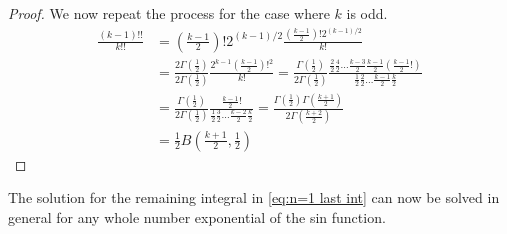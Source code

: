 \documentclass{article}
\begin{document}
\begin{proof}
	We now repeat the process for the case where $k$ is odd.
	\begin{align}
		\frac{(k-1)!!}{k!!} &= \left(\frac{k-1}{2}\right)!2^{(k-1)/2}\frac{(\frac{k-1}{2})!2^{(k-1)/2}}{k!} \\
		&= \frac{2\Gamma(\frac{1}{2})}{2\Gamma(\frac{1}{2})}\frac{2^{k-1}(\frac{k-1}{2})!^2}{k!} = \frac{\Gamma(\frac{1}{2})}{2\Gamma(\frac{1}{2})}\frac{\frac{2}{2}\frac{4}{2}\hdots\frac{k-3}{2}\frac{k-1}{2}(\frac{k-1}{2}!)}{\frac{1}{2}\frac{2}{2}\hdots\frac{k-1}{2}\frac{k}{2}} \\
		&= \frac{\Gamma(\frac{1}{2})}{2\Gamma(\frac{1}{2})}\frac{\frac{k-1}{2}!}{\frac{1}{2}\frac{3}{2}\hdots\frac{k-2}{2}\frac{k}{2}} = \frac{\Gamma(\frac{1}{2})\Gamma(\frac{k+1}{2})}{2\Gamma(\frac{k+2}{2})} \\
		&= \frac{1}{2}B\left(\frac{k+1}{2}, \frac{1}{2}\right)
	\end{align}
\end{proof}

The solution for the remaining integral in \ref{eq:n=1 last int} can now be solved in general for any whole number exponential of the
sin function.
\end{document}
